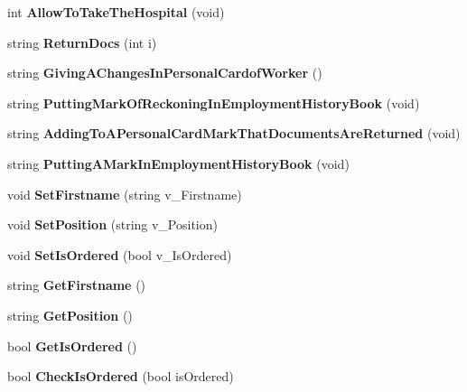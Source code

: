 \begin{DoxyCompactItemize}
int {\bfseries Allow\+To\+Take\+The\+Hospital} (void)
\item 
\mbox{\label{class_h_r_a0047e05a0a5ebee5dfafe50fe61ee373}} 
string {\bfseries Return\+Docs} (int i)
\item 
\mbox{\label{class_h_r_ad794de5aee2a01b9ac3d5f22d435afba}} 
string {\bfseries Giving\+A\+Changes\+In\+Personal\+Cardof\+Worker} ()
\item 
\mbox{\label{class_h_r_a3f962907d6ed8e81da66d4608ff3660d}} 
string {\bfseries Putting\+Mark\+Of\+Reckoning\+In\+Employment\+History\+Book} (void)
\item 
\mbox{\label{class_h_r_a896d89581c96f0dcedca7440d2798d15}} 
string {\bfseries Adding\+To\+A\+Personal\+Card\+Mark\+That\+Documents\+Are\+Returned} (void)
\item 
\mbox{\label{class_h_r_aacf64628213ae72aa5ff5a1b44e829fa}} 
string {\bfseries Putting\+A\+Mark\+In\+Employment\+History\+Book} (void)
\item 
\mbox{\label{class_h_r_a795d089594c22910ea58938faf131b67}} 
void {\bfseries Set\+Firstname} (string v\+\_\+\+Firstname)
\item 
\mbox{\label{class_h_r_ae092262d1dc245604fdb37fbe5564362}} 
void {\bfseries Set\+Position} (string v\+\_\+\+Position)
\item 
\mbox{\label{class_h_r_ac927323d22c1580b0b6d258e28294322}} 
void {\bfseries Set\+Is\+Ordered} (bool v\+\_\+\+Is\+Ordered)
\item 
\mbox{\label{class_h_r_a03a185de9601109b13c6a34c381b7b6f}} 
string {\bfseries Get\+Firstname} ()
\item 
\mbox{\label{class_h_r_aed5b4581248646ba06467442b080c262}} 
string {\bfseries Get\+Position} ()
\item 
\mbox{\label{class_h_r_acbee31efce04c45b16cd9f24c7e2359c}} 
bool {\bfseries Get\+Is\+Ordered} ()
\item 
\mbox{\label{class_h_r_af2203b0b515794db46c12b02bc9b9bd2}} 
bool {\bfseries Check\+Is\+Ordered} (bool is\+Ordered)
\end{DoxyCompactItemize}
